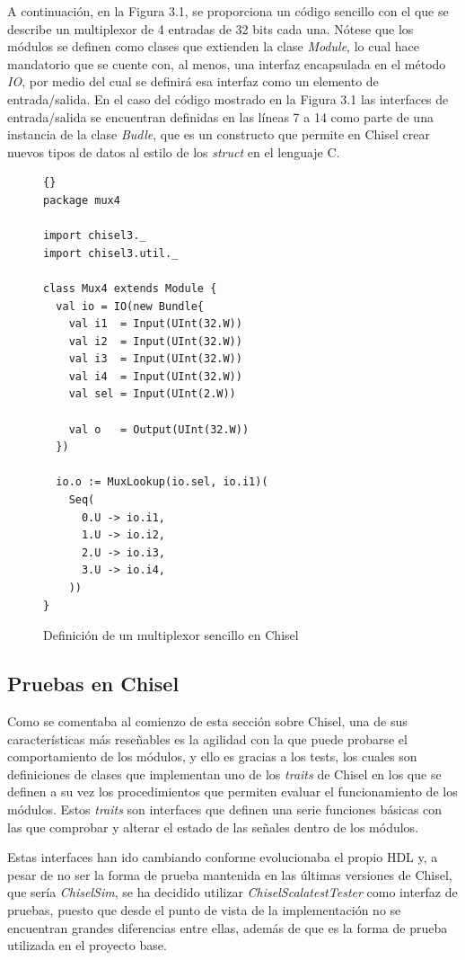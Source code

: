A continuación, en la Figura 3.1, se proporciona un código sencillo con el que se describe un multiplexor de 4 entradas de 32 bits cada una. Nótese que los módulos se definen como clases que extienden la clase \textit{Module}, lo cual hace mandatorio que se cuente con, al menos, una interfaz encapsulada en el método \textit{IO}, por medio del cual se definirá esa interfaz como un elemento de entrada/salida. En el caso del código mostrado en la Figura 3.1 las interfaces de entrada/salida se encuentran definidas en las líneas 7 a 14 como parte de una instancia de la clase \textit{Budle}, que es un constructo que permite en Chisel crear nuevos tipos de datos al estilo de los \textit{struct} en el lenguaje C.

\begin{figure}
\begin{lstlisting}[style=scalaStyle]{}
package mux4

import chisel3._
import chisel3.util._

class Mux4 extends Module {
  val io = IO(new Bundle{
    val i1  = Input(UInt(32.W))
    val i2  = Input(UInt(32.W))
    val i3  = Input(UInt(32.W))
    val i4  = Input(UInt(32.W))
    val sel = Input(UInt(2.W))

    val o   = Output(UInt(32.W))
  })

  io.o := MuxLookup(io.sel, io.i1)(
    Seq(
      0.U -> io.i1,
      1.U -> io.i2,
      2.U -> io.i3,
      3.U -> io.i4,
    ))
}
\end{lstlisting}
\caption{Definición de un multiplexor sencillo en Chisel}
\end{figure}

\subsection{Pruebas en Chisel}

Como se comentaba al comienzo de esta sección sobre Chisel, una de sus características más reseñables es la agilidad con la que puede probarse el comportamiento de los módulos, y ello es gracias a los tests, los cuales son definiciones de clases que implementan uno de los \textit{traits} de Chisel en los que se definen a su vez los procedimientos que permiten evaluar el funcionamiento de los módulos. Estos \textit{traits} son interfaces que definen una serie funciones básicas con las que comprobar y alterar el estado de las señales dentro de los módulos.

Estas interfaces han ido cambiando conforme evolucionaba el propio HDL y, a pesar de no ser la forma de prueba mantenida en las últimas versiones de Chisel, que sería \textit{ChiselSim}, se ha decidido utilizar \textit{ChiselScalatestTester} como interfaz de pruebas, puesto que desde el punto de vista de la implementación no se encuentran grandes diferencias entre ellas, además de que es la forma de prueba utilizada en el proyecto base.

